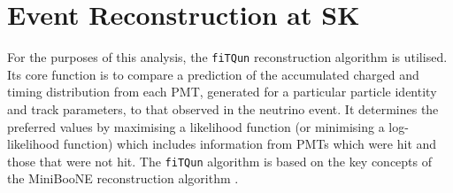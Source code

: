 \newpage
\section{Event Reconstruction at SK}
\label{sec:Simulation_Reconstruction}



For the purposes of this analysis, the \texttt{fiTQun} reconstruction algorithm \cite{t2k_tn_146} is utilised. Its core function is to compare a prediction of the accumulated charged and timing distribution from each PMT, generated for a particular particle identity and track parameters, to that observed in the neutrino event. It determines the preferred values by maximising a likelihood function (or minimising a log-likelihood function) which includes information from PMTs which were hit and those that were not hit. The \texttt{fiTQun} algorithm is based on the key concepts of the MiniBooNE reconstruction algorithm \cite{Patterson_2009}.

